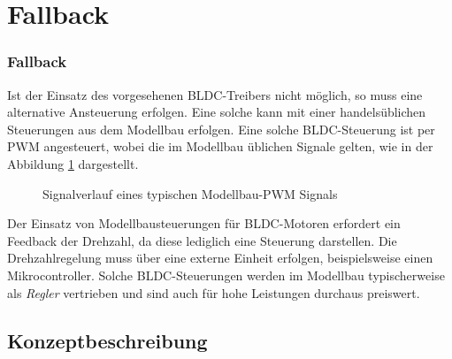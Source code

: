 \ifSTANDALONE
\section{Fallback}
\fi
\ifEMBED
\subsubsection{Fallback}
\fi
Ist der Einsatz des vorgesehenen BLDC-Treibers nicht möglich, so muss eine
alternative Ansteuerung erfolgen. Eine solche kann mit einer handelsüblichen
Steuerungen aus dem Modellbau erfolgen. Eine solche BLDC-Steuerung ist per
PWM angesteuert, wobei die im Modellbau üblichen Signale gelten, wie in der
Abbildung \ref{fig:rc-pwm} dargestellt.

\begin{figure}[h!]
	\centering
	\caption{Signalverlauf eines typischen Modellbau-PWM Signals}
	\label{fig:rc-pwm}
\end{figure}

Der Einsatz von Modellbausteuerungen für BLDC-Motoren erfordert ein
Feedback der Drehzahl, da diese lediglich eine Steuerung darstellen. Die
Drehzahlregelung muss über eine externe Einheit erfolgen, beispielsweise einen
Mikrocontroller. Solche BLDC-Steuerungen werden im Modellbau typischerweise als
\emph{Regler} vertrieben und sind auch für hohe Leistungen durchaus preiswert.

\ifSTANDALONE
\subsection{Konzeptbeschreibung}
\fi
\ifEMBED
\newpage
